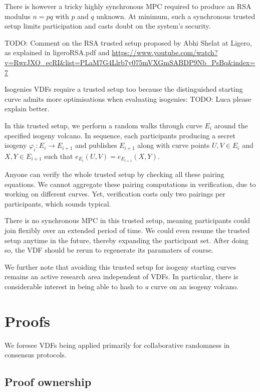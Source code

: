 \documentclass{article}
\begin{document}
There is however a tricky highly synchronous MPC required to produce
an RSA modulus $n = p q$ with $p$ and $q$ unknown.  At minimum, such
a synchronous trusted setup limits participation and casts doubt on
the system's security.  

TODO: Comment on the RSA trusted setup proposed by Abhi Shelat at Ligero, as explained in ligeroRSA.pdf and  \url{https://www.youtube.com/watch?v=RwrJXO_ecRI&list=PLaM7G4Llrb7y075mVXGmSABDP9Nb_PsBq&index=7}

Isogenies VDFs require a trusted setup too because the distinguished
starting curve admits more optimisations when evaluating isogenies:
TODO: Luca please explain better.

In this trusted setup, we perform a random walks through curve $E_i$
around the specified isogeny volcano.  In sequence, each participants
producing a secret isogeny $φ_i : E_i \to E_{i+1}$ and publishes
$E_{i+1}$ along with curve points $U,V \in E_i$ and $X,Y \in E_{i+1}$
such that $e_{E_i}(U,V) = e_{E_{i+1}}(X,Y)$.  

Anyone can verify the whole trusted setup by checking all these
pairing equations.  We cannot aggregate these pairing computations
in verification, due to working on different curves.  Yet, verification
costs only two pairings per participants, which sounds typical.

There is no synchronous MPC in this trusted setup, meaning participants
could join flexibly over an extended period of time.  We could even
resume the trusted setup anytime in the future, thereby expanding the
participant set.  After doing so, the VDF should be rerun to
regenerate its paramaters of course.

We further note that avoiding this trusted setup for isogeny starting
curves remains an active research area independent of VDFs. 
In particular, there is considerable interest in being able to hash to
{\it a} curve on an isogeny volcano.


\section{Proofs}

We foresee VDFs being applied primarily for collaborative randomness
in consensus protocols.  

\subsection{Proof ownership}
\end{document}
